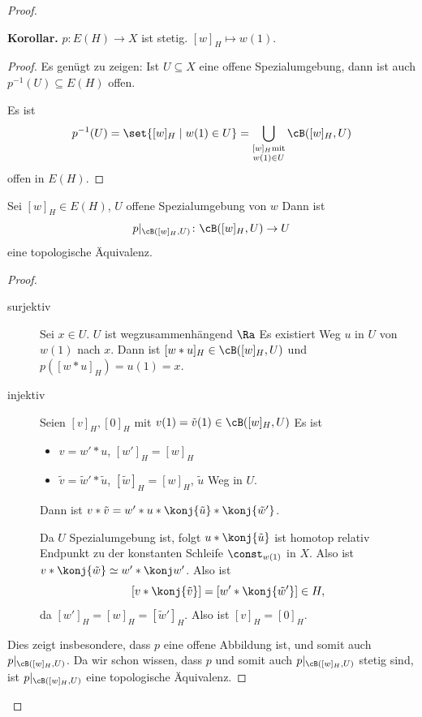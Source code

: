 \documentclass[language=ngerman]{TemplateLecture} %
\begin{document}
\begin{proof}
\begin{description}
\begin{description}
            \textbf{Korollar.} \(p \colon E(H) \to X\) ist stetig. \([w]_H \mapsto w(1)\).

            \begin{proof}
                Es genügt zu zeigen: Ist \(U\subseteq X\) eine offene Spezialumgebung, dann ist auch \(p^{-1}(U) \subseteq E(H)\) offen.

                Es ist
                \[p^{-1}(U) = \set{[w]_H \mid w(1) \in U} = \bigcup_{\substack{[w]_H \text{mit} \\ w(1) \in U}} \cB([w]_H, U)\]
                offen in \(E(H)\).
            \end{proof}

            \begin{lem}{}{}
                Sei \([w]_H \in E(H)\), \(U\) offene Spezialumgebung von \(w\) Dann ist
                \[p\rvert_{\cB([w]_H, U)} \colon \cB([w]_H, U) \to U\]
                eine topologische Äquivalenz.
            \end{lem}

            \begin{proof}
                \begin{description}
                    \item[surjektiv] Sei \(x \in U\). \(U\) ist wegzusammenhängend \(\Ra\) Es existiert Weg \(u\) in \(U\) von \(w(1)\) nach \(x\). Dann ist \([w * u]_H \in \cB([w]_H, U)\) und \(p([w * u]_H) = u(1) = x\).
                    \item[injektiv] Seien \([v]_H, [0]_H\) mit \(v(1) = \tilde v (1) \in \cB([w]_H, U)\) Es ist \begin{itemize}
                        \item \(v = w' * u\), \([w']_H = [w]_H\)
                        \item \(\tilde v = \tilde w' * \tilde u\), \([\tilde w]_H = [w]_H\), \(\tilde u\) Weg in \(U\).
                    \end{itemize} 
                    Dann ist \(v * \tilde v = w' * u * \konj{\tilde u} * \konj{\tilde w'}\).

                    Da \(U\) Spezialumgebung ist, folgt \(u* \konj{\tilde u}\) ist homotop relativ Endpunkt zu der konstanten Schleife \(\const_{w(1)}\) in \(X\). Also ist \(v *\konj{\tilde w} \simeq w' * \konj w '\). Also ist
                    \[[v* \konj {\tilde v}] = [w' * \konj{\tilde w'}] \in H,\] da \([w']_H = [w]_H = [\tilde w']_H\). Also ist \([v]_H = [0]_H\).
                \end{description}
                Dies zeigt insbesondere, dass \(p\) eine offene Abbildung ist, und somit auch \(p\rvert_{\cB([w]_H, U)}\). Da wir schon wissen, dass \(p\) und somit auch \(p\rvert_{\cB([w]_H, U)}\) stetig sind, ist \(p\rvert_{\cB([w]_H, U)}\) eine topologische Äquivalenz.
            \end{proof}


\end{description}
\end{description}
\end{proof}
\end{document}
